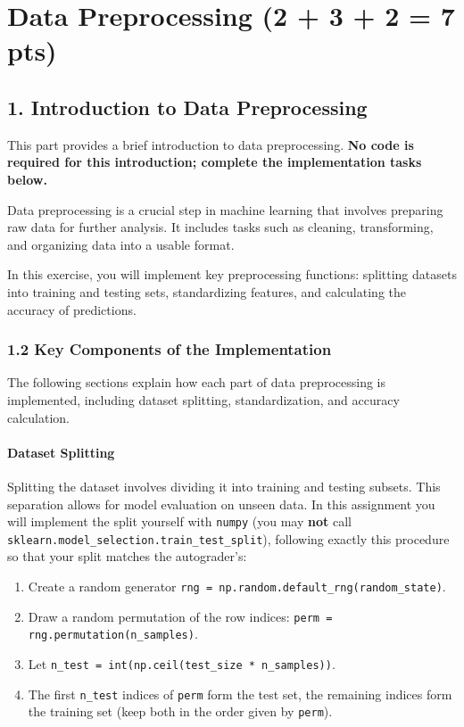 \documentclass{article}
\newcounter{questionno}
\newcounter{partno}
\newcommand{\question}[1]{
\noindent
\newline
\stepcounter{questionno}
\setcounter{partno}{0}
{\bf \large Q\arabic{questionno} (#1 pts): }
}
\begin{document}
\newpage

\section{Data Preprocessing (2 + 3 + 2 = 7 pts)}

\subsection*{1. Introduction to Data Preprocessing}
This part provides a brief introduction to data preprocessing. \textbf{No code is required for this introduction; complete the implementation tasks below.}

Data preprocessing is a crucial step in machine learning that involves preparing raw data for further analysis. It includes tasks such as cleaning, transforming, and organizing data into a usable format.

In this exercise, you will implement key preprocessing functions: splitting datasets into training and testing sets, standardizing features, and calculating the accuracy of predictions.

\subsubsection*{1.2 Key Components of the Implementation}
The following sections explain how each part of data preprocessing is implemented, including dataset splitting, standardization, and accuracy calculation.

\paragraph{Dataset Splitting}
Splitting the dataset involves dividing it into training and testing subsets. This separation allows for model evaluation on unseen data. In this assignment you will implement the split yourself with \verb|numpy| (you may \textbf{not} call \verb|sklearn.model_selection.train_test_split|), following exactly this procedure so that your split matches the autograder's:
\begin{enumerate}
    \item Create a random generator \verb|rng = np.random.default_rng(random_state)|.
    \item Draw a random permutation of the row indices: \verb|perm = rng.permutation(n_samples)|.
    \item Let \verb|n_test = int(np.ceil(test_size * n_samples))|.
    \item The first \verb|n_test| indices of \verb|perm| form the test set, the remaining indices form the training set (keep both in the order given by \verb|perm|).
\end{enumerate}
\end{document}
